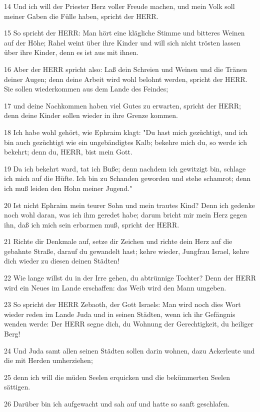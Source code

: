\par 14 Und ich will der Priester Herz voller Freude machen, und mein Volk soll meiner Gaben die Fülle haben, spricht der HERR.
\par 15 So spricht der HERR: Man hört eine klägliche Stimme und bitteres Weinen auf der Höhe; Rahel weint über ihre Kinder und will sich nicht trösten lassen über ihre Kinder, denn es ist aus mit ihnen.
\par 16 Aber der HERR spricht also: Laß dein Schreien und Weinen und die Tränen deiner Augen; denn deine Arbeit wird wohl belohnt werden, spricht der HERR. Sie sollen wiederkommen aus dem Lande des Feindes;
\par 17 und deine Nachkommen haben viel Gutes zu erwarten, spricht der HERR; denn deine Kinder sollen wieder in ihre Grenze kommen.
\par 18 Ich habe wohl gehört, wie Ephraim klagt: "Du hast mich gezüchtigt, und ich bin auch gezüchtigt wie ein ungebändigtes Kalb; bekehre mich du, so werde ich bekehrt; denn du, HERR, bist mein Gott.
\par 19 Da ich bekehrt ward, tat ich Buße; denn nachdem ich gewitzigt bin, schlage ich mich auf die Hüfte. Ich bin zu Schanden geworden und stehe schamrot; denn ich muß leiden den Hohn meiner Jugend."
\par 20 Ist nicht Ephraim mein teurer Sohn und mein trautes Kind? Denn ich gedenke noch wohl daran, was ich ihm geredet habe; darum bricht mir mein Herz gegen ihn, daß ich mich sein erbarmen muß, spricht der HERR.
\par 21 Richte dir Denkmale auf, setze dir Zeichen und richte dein Herz auf die gebahnte Straße, darauf du gewandelt hast; kehre wieder, Jungfrau Israel, kehre dich wieder zu diesen deinen Städten!
\par 22 Wie lange willst du in der Irre gehen, du abtrünnige Tochter? Denn der HERR wird ein Neues im Lande erschaffen: das Weib wird den Mann umgeben.
\par 23 So spricht der HERR Zebaoth, der Gott Israels: Man wird noch dies Wort wieder reden im Lande Juda und in seinen Städten, wenn ich ihr Gefängnis wenden werde: Der HERR segne dich, du Wohnung der Gerechtigkeit, du heiliger Berg!
\par 24 Und Juda samt allen seinen Städten sollen darin wohnen, dazu Ackerleute und die mit Herden umherziehen;
\par 25 denn ich will die müden Seelen erquicken und die bekümmerten Seelen sättigen.
\par 26 Darüber bin ich aufgewacht und sah auf und hatte so sanft geschlafen.
